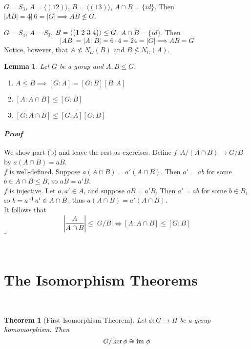 \documentclass[11pt]{book}
\newcounter{counter}
\newtheorem{theorem}[counter]{Theorem}   \newtheorem*{theorem*}{Theorem}   \newtheorem{lemma}[counter]{Lemma}   \newtheorem{corollary}[counter]{Corollary}
\theoremstyle{definition}   \newtheorem{defn}[counter]{Definition} %
\DeclareMathOperator{\ra}{\rightarrow}   \DeclareMathOperator{\Poly}{\mathbf{P}}   \DeclareMathOperator{\spn}{\textnormal{span}}   \DeclareMathOperator{\aut}{\textnormal{Aut}}
\newenvironment{prf}{\paragraph{\textit{Proof}}}{\hfill$\square$}
\newcommand{\vs}{\vspace{8pt}}
\numberwithin{counter}{chapter}
\begin{document}
\vs
\begin{example}\ \\
\item[(a)] $G = S_3$, $A = \langle (12) \rangle$, $B = \langle (13) \rangle$, $A \cap B = \{id\}$. Then $|AB| = 4 \not|\ 6 = |G| \implies AB \not\leq G$.
\item[(b)] $G = S_4$, $A = S_3$, $B = \langle \begin{pmatrix} 1 \ 2 \ 3 \ 4 \end{pmatrix} \rangle \leq G$, $A \cap B = \{id\}$. Then
	\[|AB| = |A||B| = 6 \cdot 4 = 24 = |G| \implies AB = G \]
Notice, however, that $A \not\leq N_G(B)$ and $B \not\leq N_G(A)$.
\end{example}

\vs

\begin{lemma}
Let $G$ be a group and $A,B \leq G$.
\begin{enumerate}
\item[(a)] $A \leq B \implies [G : A] = [G : B] [B : A]$
\item[(b)] $[A : A \cap B] \leq [G : B]$
\item[(c)] $[G : A \cap B] \leq [G : A] [G : B]$
\end{enumerate}
\end{lemma}

\begin{prf}
We show part (b) and leave the rest as exercises. Define $f : A / (A\cap B) \ra G/B$ by $a(A\cap B) = aB$. \\

$f$ is well-defined. Suppose $a(A\cap B) = a'(A \cap B)$. Then $a' = ab$ for some $b \in A\cap B \leq B$, so $aB = a'B$. \\

$f$ is injective. Let $a,a' \in A$, and suppose $aB = a'B$. Then $a' = ab$ for some $b \in B$, so $b = a\operatorname{^{-1}} a' \in A\cap B$, thus $a(A\cap B) = a'(A \cap B)$. \\

It follows that
	\[\left| \frac{A}{A\cap B} \right| \leq |G/B| \iff [A : A \cap B] \leq [G : B] \]
\end{prf}

\ \\

\section*{The Isomorphism Theorems}

\ \\

\begin{theorem}[First Isomorphism Theorem]
Let $\phi : G \ra H$ be a group homomorphism. Then
	\[G/\ker \phi \cong \textnormal{im } \phi \]
\end{theorem}
\end{document}
